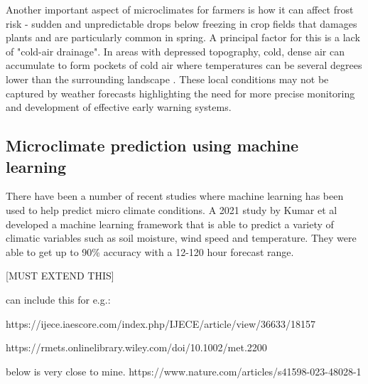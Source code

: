 Another important aspect of microclimates for farmers is how it can affect frost
risk - sudden and unpredictable drops below freezing in crop fields that damages
plants and are particularly common in spring. A principal factor for this is a
lack of "cold-air drainage". In areas with depressed topography, cold, dense air
can accumulate to form pockets of cold air where temperatures can be several
degrees lower than the surrounding landscape \cite{drepper2022}. These local
conditions may not be captured by weather forecasts highlighting the need for
more precise monitoring and development of effective early warning systems.

\subsection{Microclimate prediction using machine learning}

There have been a number of recent studies where machine learning has been used
to help predict micro climate conditions. A 2021 study by Kumar et al developed
a machine learning framework that is able to predict a variety of climatic
variables such as soil moisture, wind speed and temperature. They were able to
get up to 90\% accuracy with a 12-120 hour forecast range.

[MUST EXTEND THIS]

can include this for e.g.:

https://ijece.iaescore.com/index.php/IJECE/article/view/36633/18157


https://rmets.onlinelibrary.wiley.com/doi/10.1002/met.2200

below is very close to mine.
https://www.nature.com/articles/s41598-023-48028-1